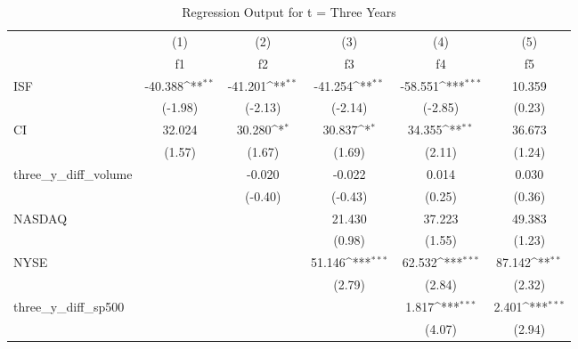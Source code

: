 \begin{table}[htbp]\centering
\def\sym#1{\ifmmode^{#1}\else\(^{#1}\)\fi}
\caption{Regression Output for t = Three Years}
\begin{tabular}{l*{5}{c}}
\hline\hline
            &\multicolumn{1}{c}{(1)}         &\multicolumn{1}{c}{(2)}         &\multicolumn{1}{c}{(3)}         &\multicolumn{1}{c}{(4)}         &\multicolumn{1}{c}{(5)}         \\
            &          f1         &          f2         &          f3         &          f4         &          f5         \\
\hline
ISF         &     -40.388\sym{**} &     -41.201\sym{**} &     -41.254\sym{**} &     -58.551\sym{***}&      10.359         \\
            &     (-1.98)         &     (-2.13)         &     (-2.14)         &     (-2.85)         &      (0.23)         \\
[1em]
CI          &      32.024         &      30.280\sym{*}  &      30.837\sym{*}  &      34.355\sym{**} &      36.673         \\
            &      (1.57)         &      (1.67)         &      (1.69)         &      (2.11)         &      (1.24)         \\
[1em]
three\_y\_diff\_volume&                     &      -0.020         &      -0.022         &       0.014         &       0.030         \\
            &                     &     (-0.40)         &     (-0.43)         &      (0.25)         &      (0.36)         \\
[1em]
NASDAQ      &                     &                     &      21.430         &      37.223         &      49.383         \\
            &                     &                     &      (0.98)         &      (1.55)         &      (1.23)         \\
[1em]
NYSE        &                     &                     &      51.146\sym{***}&      62.532\sym{***}&      87.142\sym{**} \\
            &                     &                     &      (2.79)         &      (2.84)         &      (2.32)         \\
[1em]
three\_y\_diff\_sp500&                     &                     &                     &       1.817\sym{***}&       2.401\sym{***}\\
            &                     &                     &                     &      (4.07)         &      (2.94)         \\

\end{tabular}
\end{table}
